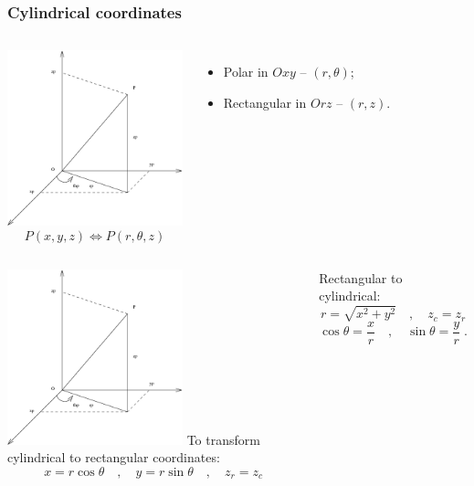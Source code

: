 \begin{frame}
 \frametitle{Cylindrical coordinates}
\begin{columns}
%
  \includegraphics[height=2in]{../../modules/coordinate-systems/pictures/cylindrical_coordinates.eps}
%
$$P(x,y,z) \Longleftrightarrow P(r, \theta, z)$$

\begin{itemize}
    \item Polar in $Oxy$ -- $(r, \theta)$;
    \item Rectangular in $Orz$ -- $(r, z)$.
\end{itemize}
\end{columns}

\end{frame}

\begin{frame}

\begin{columns}
  \includegraphics[height=2in]{../../modules/coordinate-systems/pictures/cylindrical_coordinates.eps}
%
To transform cylindrical to rectangular coordinates:\pause
$$x=r\cos\theta \quad , \quad y = r\sin\theta \quad , \quad z_{r} = z_{c}$$

Rectangular to cylindrical:\pause
$$r= \sqrt{x^2+y^2} \quad , \quad z_{c}=z_{r}$$
$$\cos\theta = \frac{x}{r} \quad , \quad \sin\theta = \frac{y}{r}\; .$$
\end{columns}
\end{frame}

